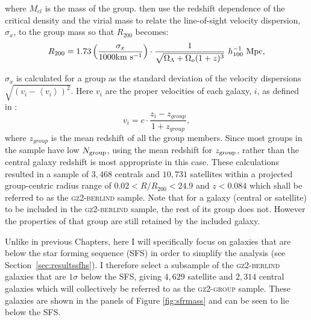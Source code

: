 where $M_{cl}$ is the mass of the group. \citeauthor{finn05} then use the redshift dependence of the critical density and the virial mass to relate the line-of-sight velocity dispersion, $\sigma_x$, to the group mass so that $R_{200}$ becomes:
\begin{equation}\label{eq:r200}
R_{200} = 1.73 \left ( \frac{\sigma_x}{1000 \rm{km}~\rm{s}^{-1}} \right) \cdot \frac{1}{\sqrt{\Omega_{\Lambda} +\Omega_o(1+z)^3}} ~ h_{100}^{-1} ~\rm{Mpc}, 
\end{equation}

$\sigma_x$ is calculated for a group as the standard deviation of the velocity dispersions $\sqrt{(v_i - \left< v_i\right>)^2}$. Here $v_i$ are the proper velocities of each galaxy, $i$, as defined in \cite{danese80}:
\begin{equation}\label{eq:propervel}
v_i = c \cdot \frac{z_i - z_{group}}{1 + z_{group}},
\end{equation}
where $z_{group}$ is the mean redshift of all the group members. Since most groups in the sample have low $N_{\rm{group}}$, using the mean redshift for $z_{\rm{group}}$, rather than the central galaxy redshift is most appropriate in this case. These calculations resulted in a sample of $3,468$ centrals and $10,731$ satellites within a projected group-centric radius range of $0.02 < R/R_{200} < 24.9$ and $z < 0.084$ which shall be referred to as the \textsc{gz2-berlind} sample. Note that for a galaxy (central or satellite) to be included in the \textsc{gz2-berlind} sample, the rest of its group does not. However the properties of that group are still retained by the included galaxy. 

Unlike in previous Chapters, here I will specifically focus on galaxies that are below the star forming sequence (SFS) in order to simplify the analysis (see Section~\ref{sec:resultssfhs}). I therefore select a subsample of the \textsc{gz2-berlind} galaxies that are $1\sigma$ below the SFS, giving $4,629$ satellite and $2,314$ central galaxies which will collectively be referred to as the \textsc{gz2-group} sample. These galaxies are shown in the panels of Figure \ref{fig:sfrmass} and can be seen to lie below the SFS.

